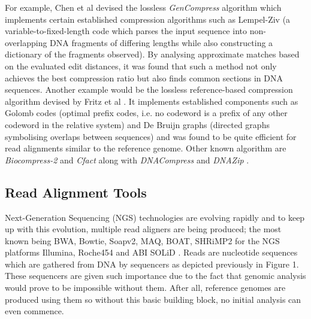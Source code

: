 \documentclass{csfyp}
\begin{document}
For example, Chen et al devised the lossless {\textit{GenCompress}} algorithm which implements certain established compression algorithms such as Lempel-Ziv \cite{gencompress} (a variable-to-fixed-length code which parses the input sequence into non-overlapping DNA fragments of differing lengths while also constructing a dictionary of the fragments observed).    By analysing approximate matches based on the evaluated edit distances, it was found that such a method not only achieves the best compression ratio but also finds common sections in DNA sequences.  Another example would be the lossless reference-based compression algorithm devised by Fritz et al \cite{refcompression}.  It implements established components such as Golomb codes (optimal prefix codes, i.e. no codeword is a prefix of any other codeword in the relative system) and De Bruijn graphs (directed graphs symbolising overlaps between sequences) and was found to be quite efficient for read alignments similar to the reference genome.  Other known algorithm are {\textit{Biocompress-2}} and {\textit{Cfact}} \cite{gencompress} along with {\textit{DNACompress}} and {\textit{ DNAZip}} \cite{refcompression}.          

\subsection{Read Alignment Tools}\vspace{-2ex}
Next-Generation Sequencing (NGS) technologies are evolving rapidly and to keep up with this evolution, multiple read aligners are being produced; the most known being BWA, Bowtie, Soapv2, MAQ, BOAT, SHRiMP2 for the NGS platforms Illumina, Roche454 and ABI SOLiD \cite{bwtransform, popgen, cgreads}.  Reads are nucleotide sequences which are gathered from DNA by sequencers as depicted previously in Figure 1.  These sequencers are given such importance due to the fact that genomic analysis would prove to be impossible without them.  After all, reference genomes are produced using them so without this basic building block, no initial analysis can even commence.     
\end{document}
